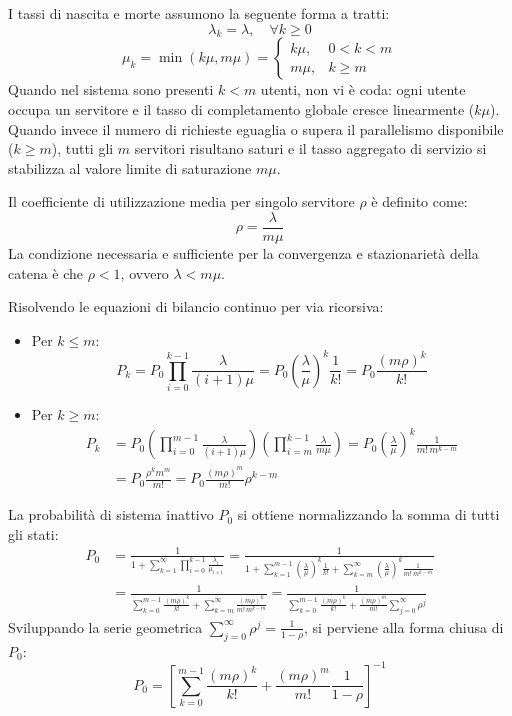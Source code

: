 \documentclass[11pt, a4paper]{article}
\begin{document}
I tassi di nascita e morte assumono la seguente forma a tratti:
\[
\lambda_k = \lambda, \quad \forall k \ge 0
\]
\[
\mu_k = \min(k\mu, m\mu) =
\begin{cases}
k\mu, & 0 < k < m \\
m\mu, & k \ge m
\end{cases}
\]
Quando nel sistema sono presenti $k < m$ utenti, non vi è coda: ogni utente occupa un servitore e il tasso di completamento globale cresce linearmente ($k\mu$). Quando invece il numero di richieste eguaglia o supera il parallelismo disponibile ($k \ge m$), tutti gli $m$ servitori risultano saturi e il tasso aggregato di servizio si stabilizza al valore limite di saturazione $m\mu$.


Il coefficiente di utilizzazione media per singolo servitore $\rho$ è definito come:
\[
\rho = \frac{\lambda}{m\mu}
\]
La condizione necessaria e sufficiente per la convergenza e stazionarietà della catena è che $\rho < 1$, ovvero $\lambda < m\mu$.

Risolvendo le equazioni di bilancio continuo per via ricorsiva:
\begin{itemize}
    \item Per $k \le m$:
    \[
    P_k = P_0 \prod_{i=0}^{k-1} \frac{\lambda}{(i+1)\mu} = P_0 \left( \frac{\lambda}{\mu} \right)^k \frac{1}{k!} = P_0 \frac{(m\rho)^k}{k!}
    \]
    \item Per $k \ge m$:
    \begin{align*}
    P_k &= P_0 \left( \prod_{i=0}^{m-1} \frac{\lambda}{(i+1)\mu} \right) \left( \prod_{i=m}^{k-1} \frac{\lambda}{m\mu} \right) = P_0 \left( \frac{\lambda}{\mu} \right)^k \frac{1}{m! \, m^{k-m}} \\
    &= P_0 \frac{\rho^k m^m}{m!} = P_0 \frac{(m\rho)^m}{m!} \rho^{k-m}
    \end{align*}
\end{itemize}
La probabilità di sistema inattivo $P_0$ si ottiene normalizzando la somma di tutti gli stati:
\begin{align*}
P_0 &= \frac{1}{1 + \sum_{k=1}^{\infty} \prod_{i=0}^{k-1} \frac{\lambda_i}{\mu_{i+1}}} = \frac{1}{1 + \sum_{k=1}^{m-1} \left( \frac{\lambda}{\mu} \right)^k \frac{1}{k!} + \sum_{k=m}^{\infty} \left( \frac{\lambda}{\mu} \right)^k \frac{1}{m! \, m^{k-m}}} \\
&= \frac{1}{\sum_{k=0}^{m-1} \frac{(m\rho)^k}{k!} + \sum_{k=m}^{\infty} \frac{(m\rho)^k}{m! \, m^{k-m}}} = \frac{1}{\sum_{k=0}^{m-1} \frac{(m\rho)^k}{k!} + \frac{(m\rho)^m}{m!} \sum_{j=0}^{\infty} \rho^j}
\end{align*}
Sviluppando la serie geometrica $\sum_{j=0}^{\infty} \rho^j = \frac{1}{1-\rho}$, si perviene alla forma chiusa di $P_0$:
\[
\boxed{P_0 = \left[ \sum_{k=0}^{m-1} \frac{(m\rho)^k}{k!} + \frac{(m\rho)^m}{m!} \frac{1}{1 - \rho} \right]^{-1}}
\]
\end{document}
